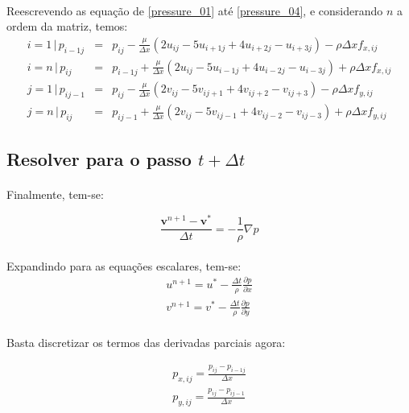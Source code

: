 \documentclass[poisson.tex]{subfiles}
\begin{document}
\paragraph{} Reescrevendo as equação de \ref{pressure_01} até \ref{pressure_04}, e considerando $n$ a ordem da matriz, temos:
\begin{eqnarray}
i=1 \,|\, p_{i-1j}&=&p_{ij}-\frac{\mu}{\Delta x}\left(2u_{ij}-5u_{i+1j}+4u_{i+2j}-u_{i+3j}\right)-\rho\Delta x f_{x,ij}\\
i=n \,|\, p_{ij}&=&p_{i-1j}+\frac{\mu}{\Delta x}\left(2u_{ij}-5u_{i-1j}+4u_{i-2j}-u_{i-3j}\right)+\rho\Delta x f_{x,ij}\\
j=1 \,|\, p_{ij-1}&=&p_{ij}-\frac{\mu}{\Delta x}\left(2v_{ij}-5v_{ij+1}+4v_{ij+2}-v_{ij+3}\right)-\rho\Delta x f_{y,ij}\\
j=n \,|\, p_{ij}&=&p_{ij-1}+\frac{\mu}{\Delta x}\left(2v_{ij}-5v_{ij-1}+4v_{ij-2}-v_{ij-3}\right)+\rho\Delta x f_{y,ij}
\end{eqnarray}
\subsection{Resolver para o passo $t+\Delta t$}
\paragraph{} Finalmente, tem-se: 

\begin{equation}
\frac{\textbf{v}^{n+1}-\textbf{v}^*}{\Delta t}=-\frac{1}{\rho}\nabla p
\end{equation}
\paragraph{} Expandindo para as equações escalares, tem-se:
\begin{eqnarray}
u^{n+1}=u^*-\frac{\Delta t}{\rho}\frac{\partial p}{\partial x}\\
v^{n+1}=v^*-\frac{\Delta t}{\rho}\frac{\partial p}{\partial y}
\end{eqnarray}
\paragraph{} Basta discretizar os termos das derivadas parciais agora:

\begin{eqnarray}
p_{x,ij}=\frac{p_{ij}-p_{i-1j}}{\Delta x}\\
p_{y,ij}=\frac{p_{ij}-p_{ij-1}}{\Delta x}
\end{eqnarray}
\end{document}
